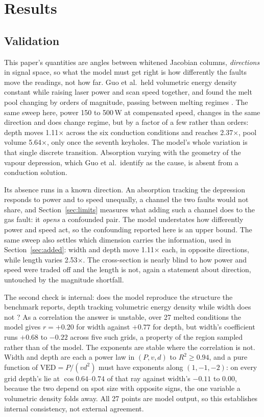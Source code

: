 \documentclass[final,5p,times,twocolumn]{elsarticle}
\begin{document}
\section{Results}

\subsection{Validation}
\label{sec:valid}

This paper's quantities are angles between whitened Jacobian columns,
\emph{directions} in signal space, so what the model must get right is how
differently the faults move the readings, not how far. Guo et al.\ held
volumetric energy density constant while raising laser power and scan speed
together, and found the melt pool changing by orders of magnitude, passing
between melting regimes \cite{Guo2019}. The same sweep here, power 150 to
500\,W at compensated speed, changes in the same direction and does change
regime, but by a factor of a few rather than orders: depth moves 1.11$\times$
across the six conduction conditions and reaches 2.37$\times$, pool volume
5.64$\times$, only once the seventh keyholes. The model's whole variation is
that single discrete transition. Absorption varying with the geometry of the
vapour depression, which Guo et al.\ identify as the cause, is absent from a
conduction solution.

Its absence runs in a known direction. An absorption tracking the depression
responds to power and to speed unequally, a channel the two faults would not
share, and Section~\ref{sec:limits} measures what adding such a channel does to
the gas fault: it \emph{opens} a confounded pair. The model understates how
differently power and speed act, so the confounding reported here is an upper
bound. The same sweep also settles which dimension carries the information, used
in Section~\ref{sec:added}: width and depth move 1.11$\times$ each, in opposite
directions, while length varies 2.53$\times$. The cross-section is nearly blind
to how power and speed were traded off and the length is not, again a
statement about direction, untouched by the magnitude shortfall.

The second check is internal: does the model reproduce the structure the
benchmark reports, depth tracking volumetric energy density while width does not
\cite{Weaver2024}? As a correlation the answer is unstable, over 27 melted
conditions the model gives $r=+0.20$ for width against $+0.77$ for depth, but
width's coefficient runs $+0.68$ to $-0.22$ across five such grids, a property of
the region sampled rather than of the model. The exponents are stable where the
correlation is not. Width and depth are each a power law in $(P,v,d)$ to
$R^{2}\ge0.94$, and a pure function of $\mathrm{VED}=P/(vd^{2})$ must have
exponents along $(1,-1,-2)$: on every grid depth's lie at $\cos 0.64$--$0.74$ of
that ray against width's $-0.11$ to $0.00$, because the two depend on spot size
with opposite signs, the one variable a volumetric density folds away. All 27
points are model output, so this establishes internal consistency, not external
agreement.
\end{document}
